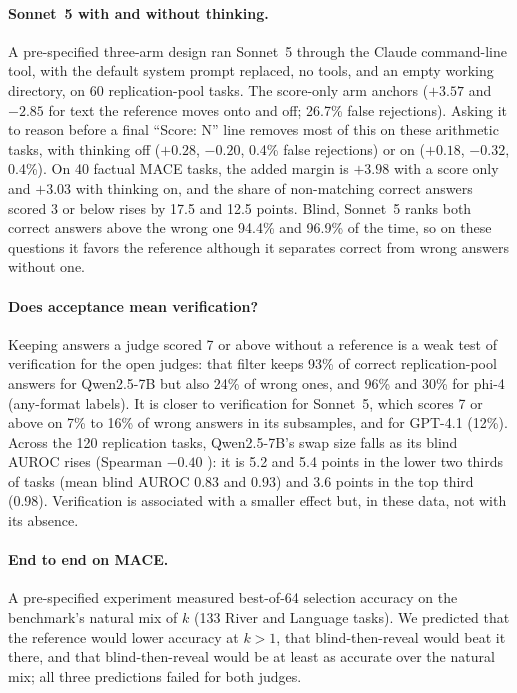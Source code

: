 \paragraph{Sonnet~5 with and without thinking.}
A pre-specified three-arm design ran Sonnet~5 through the Claude command-line tool, with the default system prompt replaced, no tools, and an empty working directory, on 60 replication-pool tasks. The score-only arm anchors ($+3.57$ and $-2.85$ for text the reference moves onto and off; 26.7\% false rejections). Asking it to reason before a final ``Score: N'' line removes most of this on these arithmetic tasks, with thinking off ($+0.28$, $-0.20$, 0.4\% false rejections) or on ($+0.18$, $-0.32$, 0.4\%).\pre{} On 40 factual \textsc{MACE} tasks, the added margin is $+3.98$  with a score only and $+3.03$  with thinking on, and the share of non-matching correct answers scored 3 or below rises by 17.5 and 12.5 points. Blind, Sonnet~5 ranks both correct answers above the wrong one 94.4\% and 96.9\% of the time, so on these questions it favors the reference although it separates correct from wrong answers without one.\pre

\paragraph{Does acceptance mean verification?}
Keeping answers a judge scored 7 or above without a reference is a weak test of verification for the open judges: that filter keeps 93\% of correct replication-pool answers for Qwen2.5-7B but also 24\% of wrong ones, and 96\% and 30\% for phi-4 (any-format labels). It is closer to verification for Sonnet~5, which scores 7 or above on 7\% to 16\% of wrong answers in its subsamples, and for GPT-4.1 (12\%). Across the 120 replication tasks, Qwen2.5-7B's swap size falls as its blind AUROC rises (Spearman $-0.40$ ): it is 5.2 and 5.4 points in the lower two thirds of tasks (mean blind AUROC 0.83 and 0.93) and 3.6 points in the top third (0.98). Verification is associated with a smaller effect but, in these data, not with its absence.\ph

\paragraph{End to end on \textsc{MACE}.}
A pre-specified experiment measured best-of-64 selection accuracy on the benchmark's natural mix of $k$ (133 River and Language tasks). We predicted that the reference would lower accuracy at $k{>}1$, that blind-then-reveal would beat it there, and that blind-then-reveal would be at least as accurate over the natural mix; all three predictions failed for both judges.

